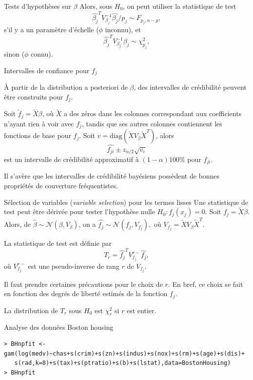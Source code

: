 \documentclass{BeamerTemplate}
\begin{document}
\begin{refsection}
\begin{frame}{Tests d'hypothèses sur $\beta$}
\bigskip
Alors, sous $H_0$, on peut utiliser la statistique de test
$$\hat{\beta_j}^T V_{\beta_j}^{-1} \hat{\beta_j}/p_j \sim F_{p_j,n-p},$$
s'il y a un paramètre d'échelle ($\phi$ inconnu), et 
$$\hat{\beta_j}^T V_{\beta_j}^{-1} \hat{\beta_j} \sim \chi_{p_j}^2,$$
sinon ($\phi$ connu).
\end{frame}

\begin{frame}{Intervalles de confiance pour $f_j$}

À partir de la distribution a posteriori de $\beta$, des intervalles de crédibilité peuvent être construits pour $f_j$. 

\bigskip
Soit $\tilde{f}_j = \tilde{X} \beta$, où $\tilde{X}$ a des zéros dans les colonnes correspondant aux coefficients n'ayant rien à voir avec $f_j$, tandis que ses autres colonnes contiennent les fonctions de base pour $f_j$. Soit $v= \mbox{diag}(\tilde{X} V_{\beta} \tilde{X}^T)$, alors
$$\hat{f_{ji}} \pm z_{\alpha/2} \sqrt{v_i}$$
est un intervalle de crédibilité approximatif à $(1-\alpha) 100 \%$ pour $f_{ji}$.

\bigskip
Il s'avère que les intervalles de crédibilité bayésiens possèdent de bonnes propriétés de couverture fréquentistes.

\end{frame}


\begin{frame}{Sélection de variables (\textit{variable selection}) pour les termes lisses}
Une statistique de test peut être dérivée pour tester l'hypothèse nulle $H_0:
f_j(x_j)=0$. Soit $f_j = \tilde{X} \beta$. Alors, de $\hat{\beta} \sim {\mathcal
N}(\beta, V_{\beta})$, on a $ \hat{f_j} \sim {\mathcal N}(f_j,  V_{f_j}),$
où $V_{f_j} = \tilde{X}  V_{\beta} \tilde{X}^T$.

\bigskip
La statistique de test est définie par
$$ T_r = \hat{f_j}^T V_{f_j}^{r -} \hat{f_j} ,$$
où $V_{f_j}^{r -}$ est une pseudo-inverse de rang $r$ de $V_{f_j}$.

\bigskip
Il faut prendre certaines précautions pour le choix de $r$. En bref, ce choix se fait en fonction des degrés de liberté estimés de la fonction $f_j$.

\bigskip
La distribution de $T_r$ sous $H_0$ est $\chi^2_r$ si $r$ est entier.
\end{frame}

\begin{frame}[fragile]{Analyse des données Boston housing}

{\tiny
\begin{verbatim}
> BHnpfit <- gam(log(medv)~chas+s(crim)+s(zn)+s(indus)+s(nox)+s(rm)+s(age)+s(dis)+
   s(rad,k=8)+s(tax)+s(ptratio)+s(b)+s(lstat),data=BostonHousing)
> BHnpfit


\end{verbatim}}
\end{frame}
\end{refsection}
\end{document}
